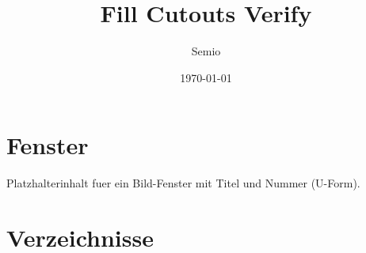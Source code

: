 \documentclass[type=report,theme=light,language=de]{semio}
\title{Fill Cutouts Verify}
\author{Semio}
\date{\today}
\begin{document}
\maketitle

\chapter{Fenster}

\begin{semiofigure}[title=Ein Beispielbild]
Platzhalterinhalt fuer ein Bild-Fenster mit Titel und Nummer (U-Form).
\end{semiofigure}

\appendix
\chapter{Verzeichnisse}
\listoffigures
\end{document}
